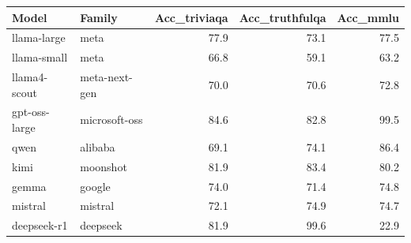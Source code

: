 \begin{tabular}{llrrr}
\toprule
Model & Family & Acc\_triviaqa & Acc\_truthfulqa & Acc\_mmlu \\
\midrule
llama-large & meta & 77.9 & 73.1 & 77.5 \\
llama-small & meta & 66.8 & 59.1 & 63.2 \\
llama4-scout & meta-next-gen & 70.0 & 70.6 & 72.8 \\
gpt-oss-large & microsoft-oss & 84.6 & 82.8 & 99.5 \\
qwen & alibaba & 69.1 & 74.1 & 86.4 \\
kimi & moonshot & 81.9 & 83.4 & 80.2 \\
gemma & google & 74.0 & 71.4 & 74.8 \\
mistral & mistral & 72.1 & 74.9 & 74.7 \\
deepseek-r1 & deepseek & 81.9 & 99.6 & 22.9 \\
\bottomrule
\end{tabular}
